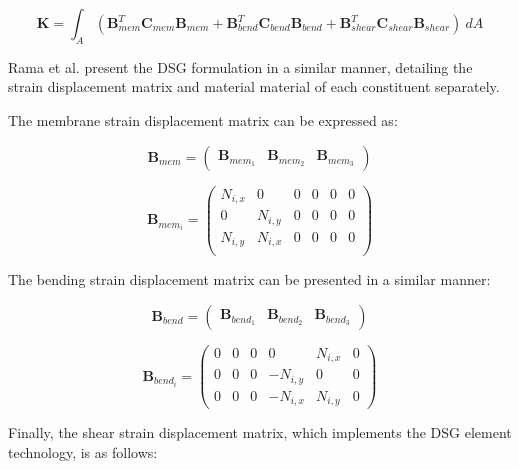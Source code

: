 \begin{equation} 
\mathbf{K} = \int_A  (\mathbf{B}_{mem}^T \mathbf{C}_{mem} \mathbf{B}_{mem} + \mathbf{B}_{bend}^T \mathbf{C}_{bend} \mathbf{B}_{bend} + \mathbf{B}_{shear}^T \mathbf{C}_{shear} \mathbf{B}_{shear})\ dA
\label{eqt5}
\end{equation}

Rama et al. \cite{Ram16} present the DSG formulation in a similar manner, detailing the strain displacement matrix and material material of each constituent separately.

The membrane strain displacement matrix can be expressed as:

\begin{equation} 
\mathbf{B}_{mem} =  \begin{pmatrix}
\mathbf{B}_{mem_1} & \mathbf{B}_{mem_2} & \mathbf{B}_{mem_3}
\end{pmatrix} 
\label{eqt6}
\end{equation}

\begin{equation} 
\mathbf{B}_{mem_i} =  \begin{pmatrix}
N_{i,x} & 0 & 0 & 0 & 0 & 0 \\
0 & N_{i,y} & 0 & 0 & 0 & 0 \\
N_{i,y} & N_{i,x} & 0 & 0 & 0 & 0 \\
\end{pmatrix} 
\label{eqt7}
\end{equation}

The bending strain displacement matrix can be presented in a similar manner:

\begin{equation} 
\mathbf{B}_{bend} =  \begin{pmatrix}
\mathbf{B}_{bend_1} & \mathbf{B}_{bend_2} & \mathbf{B}_{bend_3}
\end{pmatrix} 
\label{eqt8}
\end{equation}

\begin{equation} 
\mathbf{B}_{bend_i} =  \begin{pmatrix}
0 & 0 & 0 & 0 & N_{i,x} & 0 \\
0 & 0 & 0 & -N_{i,y} & 0 & 0 \\
0 & 0 & 0 & -N_{i,x} & N_{i,y} & 0
\end{pmatrix} 
\label{eqt9}
\end{equation}

Finally, the shear strain displacement matrix, which implements the DSG element technology, is as follows:

